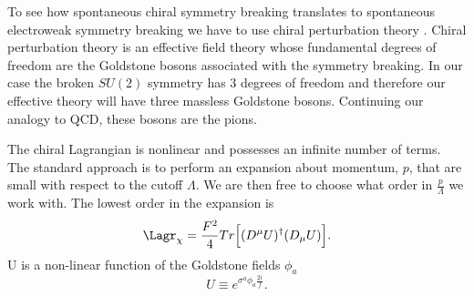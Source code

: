 To see how spontaneous chiral symmetry breaking translates to spontaneous electroweak symmetry breaking we have to use chiral perturbation theory \cite{Gasser:1983yg,Golterman:2009kw}.
Chiral perturbation theory is an effective field theory whose fundamental degrees of freedom are the Goldstone bosons associated with the symmetry breaking.
In our case the broken $SU(2)$ symmetry has 3 degrees of freedom and therefore our effective theory will have three massless Goldstone bosons.
Continuing our analogy to QCD, these bosons are the pions.

The chiral Lagrangian is nonlinear and possesses an infinite number of terms.
The standard approach is to perform an expansion about momentum, $p$, that are small with respect to the cutoff $\Lambda$.
We are then free to choose what order in $\frac{p}{\Lambda}$ we work with.
The lowest order in the expansion is
\begin{equation}
  \Lagr_{\chi}=\frac{F^2}{4}Tr\Big[(D^\mu U)^\dagger(D_\mu U)\Big].
\end{equation}
U is a non-linear function of the Goldstone fields $\phi_a$
\begin{equation}
  U\equiv e^{\sigma^a\phi_a\frac{2i}{f}}.
\end{equation}

